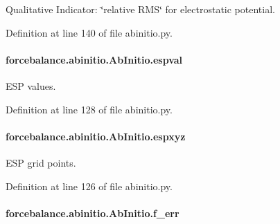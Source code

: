 Qualitative Indicator\-: \char`\"{}relative R\-M\-S\char`\"{} for electrostatic potential. 



Definition at line 140 of file abinitio.\-py.

\hypertarget{classforcebalance_1_1abinitio_1_1AbInitio_aba6d885086d455fce8c3d472fd08020d}{
\paragraph[{espval}]{\setlength{\rightskip}{0pt plus 5cm}forcebalance.\-abinitio.\-Ab\-Initio.\-espval}}\label{classforcebalance_1_1abinitio_1_1AbInitio_aba6d885086d455fce8c3d472fd08020d}


E\-S\-P values. 



Definition at line 128 of file abinitio.\-py.

\hypertarget{classforcebalance_1_1abinitio_1_1AbInitio_a8be2d088afb344036aae989ca3cbcc41}{
\paragraph[{espxyz}]{\setlength{\rightskip}{0pt plus 5cm}forcebalance.\-abinitio.\-Ab\-Initio.\-espxyz}}\label{classforcebalance_1_1abinitio_1_1AbInitio_a8be2d088afb344036aae989ca3cbcc41}


E\-S\-P grid points. 



Definition at line 126 of file abinitio.\-py.

\hypertarget{classforcebalance_1_1abinitio_1_1AbInitio_a176fb2b013ecc5ab451fd3b190414c4d}{
\paragraph[{f\-\_\-err}]{\setlength{\rightskip}{0pt plus 5cm}forcebalance.\-abinitio.\-Ab\-Initio.\-f\-\_\-err}}\label{classforcebalance_1_1abinitio_1_1AbInitio_a176fb2b013ecc5ab451fd3b190414c4d}


